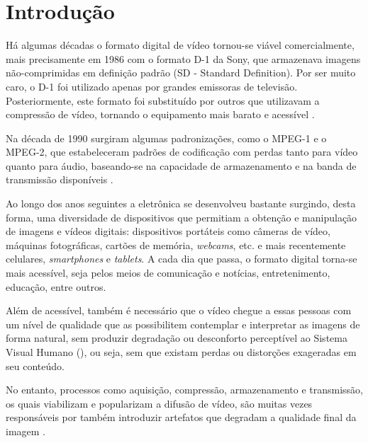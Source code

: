 
\chapter{Introdução}





Há algumas décadas o formato digital de vídeo tornou-se viável comercialmente, mais precisamente em 1986 com o formato D-1 da Sony, que armazenava imagens não-comprimidas em definição padrão (SD - Standard Definition). Por ser muito caro, o D-1 foi utilizado apenas por grandes emissoras de televisão. Posteriormente, este formato foi substituído por outros que utilizavam a compressão de vídeo, tornando o equipamento mais barato e acessível \cite{wikidigitalvideo}.

Na década de 1990 surgiram algumas padronizações, como o MPEG-1 e o MPEG-2, que estabeleceram padrões de codificação com perdas tanto para vídeo quanto para áudio, baseando-se na capacidade de armazenamento e na banda de transmissão disponíveis \cite{mpeg2ref}.

Ao longo dos anos seguintes a eletrônica se desenvolveu bastante surgindo, desta forma, uma diversidade de dispositivos que permitiam a obtenção e manipulação de imagens e vídeos digitais: dispositivos portáteis como câmeras de vídeo, máquinas fotográficas, cartões de memória, \emph{webcams}, etc. e mais recentemente celulares, \emph{smartphones} e \emph{tablets}. A cada dia que passa, o formato digital torna-se mais acessível, seja pelos meios de comunicação e notícias, entretenimento, educação, entre outros.

Além de acessível, também é necessário que o vídeo chegue a essas pessoas com um nível de qualidade que as possibilitem contemplar e interpretar as imagens de forma natural, sem produzir degradação ou desconforto perceptível ao Sistema Visual Humano (), ou seja, sem que existam perdas ou distorções exageradas em seu conteúdo.

No entanto, processos como aquisição, compressão, armazenamento e transmissão, os quais viabilizam e popularizam a difusão de vídeo, são muitas vezes responsáveis por também introduzir artefatos que degradam a qualidade final da imagem \cite{daronco, wangbovik2004}.

